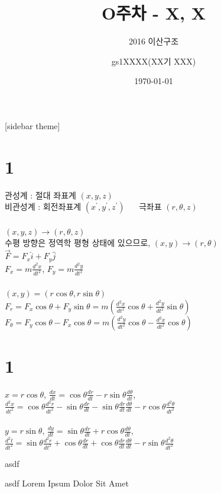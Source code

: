 \documentclass[11pt]{beamer}
\title[O주차 - X, X]{O주차 - X, X}
\subtitle[]{2016 이산구조}
\author[]{gs1XXXX(XX기 XXX)}
\institute[GSHS]{경기과학고등학교}
\date[]{\today}
\begin{document}
\begin{frame}[plain]
\titlepage
\end{frame}
[sidebar theme]



\section{1}
\begin{frame}{1.1}\footnotesize
	관성계 : 절대 좌표계 $ (x, y, z)$ \\
	비관성계 : 회전좌표계 $ (x^{\prime}, y^{\prime}, z^{\prime})$ ~~ 극좌표 $ (r, \theta, z)$\\
	\\
	$ (x, y, z) 	\rightarrow (r, \theta, z)$\\
	수평 방향은 정역학 평형 상태에 있으므로, 	$ (x, y) 	\rightarrow (r, \theta)$\\
	$ \overrightarrow {F} = F_{x} \hat{i}  + F_{y} \hat{j} $\\
	$ F_{x} = m \frac{d^{2}x}{dt^{2}}$, $ F_{y} = m \frac{d^{2}y}{dt^{2}}$\\
	\\
	$ (x, y) = (r \cos \theta, r \sin \theta)$\\
	$ F_{r} = F_{x} \cos \theta + F_{y} \sin \theta = m \left ( \frac{d^{2}x}{dt^{2}} \cos \theta + \frac{d^{2}y}{dt^{2}} \sin \theta \right) $\\
	$ F_{\theta} = F_{y} \cos \theta - F_{x} \cos \theta = m \left ( \frac{d^{2}y}{dt^{2}} \cos \theta - \frac{d^{2}x}{dt^{2}} \cos \theta \right) $\\
\end{frame}

\section{1}
\begin{frame}{1.2}\footnotesize
	$ x = r \cos \theta $, $\frac{dx}{dt} = \cos \theta \frac{dr}{dt} - r \sin \theta \frac{d\theta}{dt}$, \\
	$\frac{d^{2}x}{dt^{2}} = \cos \theta \frac{d^{2}r}{dt^{2}} - \sin \theta \frac{dr}{dt} - \sin \theta \frac{dr}{dt} \frac{d\theta}{dt} -r \cos \theta \frac{d^{2}\theta}{dt^{2}}$\\
	\\
	$ y = r \sin \theta $, $\frac{dy}{dt} = \sin \theta \frac{dr}{dt} + r \cos \theta \frac{d\theta}{dt}$, \\
	$\frac{d^{2}t}{dt^{2}} = \sin \theta \frac{d^{2}r}{dt^{2}} + \cos \theta \frac{dr}{dt} + \cos \theta \frac{dr}{dt} \frac{d\theta}{dt} -r \sin \theta \frac{d^{2}\theta}{dt^{2}}$\\

\end{frame}

\begin{frame}{asdf}
	
	\begin{block}{asdf}
		Lorem Ipsum Dolor Sit Amet
	\end{block}
\end{frame}
\end{document}
